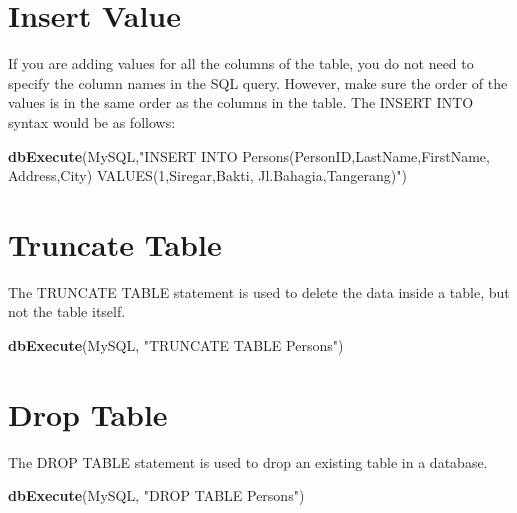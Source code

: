 \documentclass[
]{book}
\newenvironment{Shaded}{\begin{snugshade}}{\end{snugshade}}
\newcommand{\FunctionTok}[1]{\textcolor[rgb]{0.13,0.29,0.53}{\textbf{#1}}}
\newcommand{\NormalTok}[1]{#1}
\newcommand{\StringTok}[1]{\textcolor[rgb]{0.31,0.60,0.02}{#1}}
\begin{document}
\hypertarget{insert-value}{%
\section{Insert Value}\label{insert-value}}

If you are adding values for all the columns of the table, you do not need to specify the column names in the SQL query. However, make sure the order of the values is in the same order as the columns in the table. The INSERT INTO syntax would be as follows:

\begin{Shaded}
\begin{Highlighting}[]
\FunctionTok{dbExecute}\NormalTok{(MySQL,}\StringTok{"INSERT INTO Persons(PersonID,LastName,FirstName, Address,City)}
\StringTok{                 VALUES(1,\textquotesingle{}Siregar\textquotesingle{},\textquotesingle{}Bakti\textquotesingle{}, \textquotesingle{}Jl.Bahagia\textquotesingle{},\textquotesingle{}Tangerang\textquotesingle{})"}\NormalTok{)}
\end{Highlighting}
\end{Shaded}

\hypertarget{truncate-table}{%
\section{Truncate Table}\label{truncate-table}}

The TRUNCATE TABLE statement is used to delete the data inside a table, but not the table itself.

\begin{Shaded}
\begin{Highlighting}[]
\FunctionTok{dbExecute}\NormalTok{(MySQL, }\StringTok{"TRUNCATE TABLE Persons"}\NormalTok{)}
\end{Highlighting}
\end{Shaded}

\hypertarget{drop-table}{%
\section{Drop Table}\label{drop-table}}

The DROP TABLE statement is used to drop an existing table in a database.

\begin{Shaded}
\begin{Highlighting}[]
\FunctionTok{dbExecute}\NormalTok{(MySQL, }\StringTok{"DROP TABLE Persons"}\NormalTok{)}
\end{Highlighting}
\end{Shaded}
\end{document}
